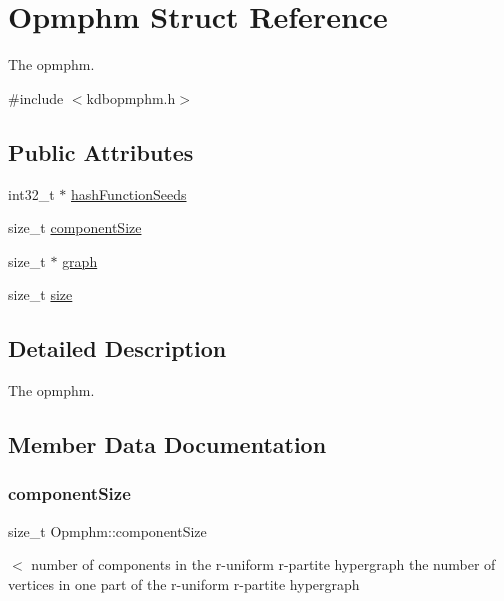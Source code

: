 \hypertarget{structOpmphm}{}\section{Opmphm Struct Reference}
\label{structOpmphm}


The opmphm.  




{\ttfamily \#include $<$kdbopmphm.\+h$>$}

\subsection*{Public Attributes}
\begin{DoxyCompactItemize}
\item 
int32\+\_\+t $\ast$ \hyperlink{structOpmphm_a522b3ab16ceb22828b54333868c9324d}{hash\+Function\+Seeds}
\item 
size\+\_\+t \hyperlink{structOpmphm_a01441fc04bd56fd6253ca4265364d39c}{component\+Size}
\item 
size\+\_\+t $\ast$ \hyperlink{structOpmphm_a9e180e696384dedcd1e4a87d6f0739b1}{graph}
\item 
size\+\_\+t \hyperlink{structOpmphm_a72e7343b4ea87b27891e760f03fd2b96}{size}
\end{DoxyCompactItemize}


\subsection{Detailed Description}
The opmphm. 

\subsection{Member Data Documentation}
\mbox{\label{structOpmphm_a01441fc04bd56fd6253ca4265364d39c}} 
\subsubsection{\texorpdfstring{component\+Size}{componentSize}}
{\footnotesize\ttfamily size\+\_\+t Opmphm\+::component\+Size}

$<$ number of components in the r-\/uniform r-\/partite hypergraph the number of vertices in one part of the r-\/uniform r-\/partite hypergraph \mbox{\label{structOpmphm_a9e180e696384dedcd1e4a87d6f0739b1}} 
